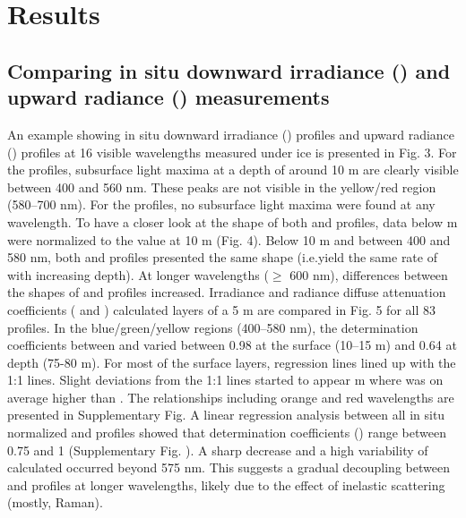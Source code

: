 \section{Results}

\subsection{Comparing in situ downward irradiance (\ed{}) and upward radiance (\lu{}) measurements}

An example showing in situ downward irradiance (\ed{}) profiles and upward radiance (\lu{}) profiles at 16 visible wavelengths measured under ice is presented in Fig. 3. For the \ed{} profiles, subsurface light maxima at a depth of around 10 m are clearly visible between 400 and 560 nm. These peaks are not visible in the yellow/red region (580--700 nm). For the \lu{} profiles, no subsurface light maxima were found at any wavelength. To have a closer look at the shape of both \ed{} and \lu{} \DIFdelbegin {}\DIFdelend profiles, data below \DIFaddbegin {} m \DIFaddbegin {}\DIFaddend were normalized to the value at 10 m (Fig. 4). Below 10 m and between 400 and 580 nm, both \ed{} and \lu{} profiles presented the same shape (i.e.\DIFaddbegin \DIFadd{, }\DIFaddend yield the same rate of \DIFdelbegin {}\DIFdelend \DIFaddbegin {}\DIFaddend with increasing depth). At longer wavelengths ($\ge$ 600 nm), differences between the shapes of \ed{} and \lu{} profiles increased. Irradiance and radiance diffuse attenuation coefficients (\ked{} and \klu{}) calculated \DIFdelbegin {}\DIFdelend \DIFaddbegin {}\DIFaddend layers of a 5 m \DIFdelbegin {}\DIFdelend \DIFaddbegin {}\DIFaddend are compared in Fig. 5 for all 83 profiles. In the blue/green/yellow regions (400--580 nm), the determination coefficients between \klu{} and \ked{} varied between 0.98 at the surface (10--15 m) and 0.64 at depth (75-80 m). For most of the surface layers, regression lines lined up with the 1:1 lines. Slight deviations from the 1:1 lines started to appear \DIFdelbegin {}\DIFdelend \DIFaddbegin {} m where \ked{} was on average higher than \klu{}. The relationships including orange and red wavelengths are presented in Supplementary Fig. \DIFdelbegin {}\DIFdelend \DIFaddbegin {}\DIFaddend A linear regression analysis between all in situ normalized \ed{} and \lu{} profiles showed that determination coefficients (\rsquared{}) range between 0.75 and 1 (Supplementary Fig. \DIFdelbegin {}\DIFdelend \DIFaddbegin {}\DIFaddend ). A sharp decrease and a high variability of calculated \rsquared{} occurred beyond 575 nm. This suggests a gradual decoupling between \ed{} and \lu{} profiles at longer wavelengths, likely due to the effect of inelastic scattering (mostly, Raman). 


